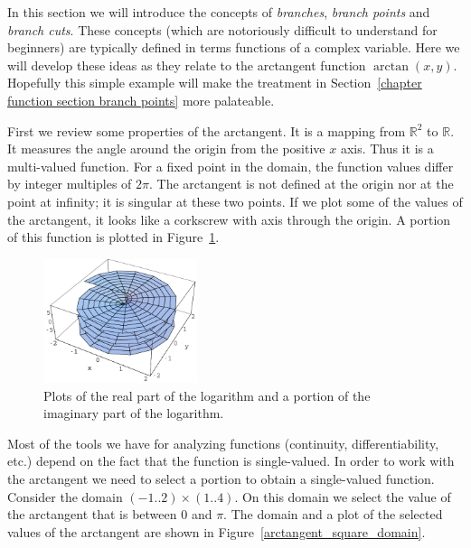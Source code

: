 In this section we will introduce the concepts of \textit{branches}, 
\textit{branch points} and \textit{branch cuts}.  These concepts 
(which are notoriously difficult to understand for beginners)
are typically
defined in terms functions of a complex variable.  Here we will develop
these ideas as they relate to the arctangent function $\arctan(x,y)$.
Hopefully this simple example will make the treatment in 
Section~\ref{chapter function section branch points} more palateable.

First we review some properties of the arctangent.  It is a mapping from
$\mathbb{R}^2$ to $\mathbb{R}$.  It measures the angle around the 
origin from the positive $x$ axis.  Thus it is a multi-valued function.
For a fixed point in the domain, the function values differ by integer 
multiples of $2 \pi$.  The arctangent is not defined at the origin nor 
at the point at infinity; it is singular at these two points.  If we plot 
some of the values of the arctangent, it looks like a corkscrew with 
axis through the origin.  A portion of this function is plotted in
Figure~\ref{arctangent_few}.


\begin{figure}[htbp!]
  \begin{center}
    \includegraphics[width=0.4\textwidth]{fcv/function/arctangent_few}
  \end{center}
  \caption{Plots of the real part of the logarithm and a portion of 
    the imaginary part of the logarithm.}
  \label{arctangent_few}
\end{figure}

Most of the tools we have for analyzing functions (continuity, 
differentiability, etc.) depend on the fact that the function is 
single-valued.  In order to work with the arctangent we need to select a 
portion to obtain a single-valued function.  Consider the domain 
$(-1 .. 2) \times (1 .. 4)$.  On this domain we select the value of 
the arctangent that is between $0$ and $\pi$.  The domain and a plot of the 
selected values of the arctangent are shown in 
Figure~\ref{arctangent_square_domain}.


